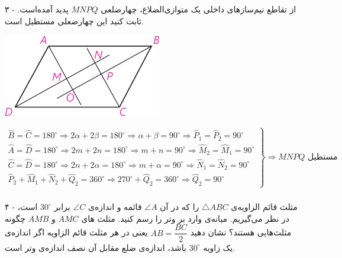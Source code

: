 \documentclass[12pt, a4paper]{book}
\begin{document}
	\subsubsection[3]{}
	    \begin{minipage}{.75\textwidth}
			
			۳ - از تقاطع نیم‌سازهای داخلی یک متوازی‌الضلاع، چهارضلعی
			$MNPQ$
			پدید آمده‌است. ثابت کنید این چهارضعلی مستطیل است.
	   \end{minipage}
	   \begin{minipage}{.25\textwidth}
	   	\begin{flushleft}
	   		\includegraphics{"Shapes/Fasl - 3/Dars 1/PDFs/P63-S5.pdf"}
	   	\end{flushleft}
	   \end{minipage}
   
   	\begin{flushleft}
	$
   		\left.
   			\begin{array}{lll}
   				\widehat{B} = \widehat{C} = 180^{\circ} \Rightarrow 2 \alpha + 2 \beta =180^{\circ} \Rightarrow \alpha + \beta = 90^{\circ}  \Rightarrow \widehat{P}_1 = \widehat{P}_2 = 90^{\circ} \\
			   	\widehat{A} = \widehat{D} = 180^{\circ} \Rightarrow 2m + 2n =180^{\circ} \Rightarrow m + n = 90^{\circ}  \Rightarrow \widehat{M}_2 = \widehat{M}_1 = 90^{\circ} \\
			   	\widehat{C} = \widehat{D} = 180^{\circ} \Rightarrow 2 n + 2 \alpha =180^{\circ} \Rightarrow m + \alpha = 90^{\circ}  \Rightarrow \widehat{N}_1 = \widehat{N}_2 = 90^{\circ}  \\
	   	   		\widehat{P}_2 + \widehat{M}_1 + \widehat{N}_2 + \widehat{Q}_2= 360^{\circ} \Rightarrow 270^{\circ} + \widehat{Q}_2 = 360^{\circ} \Rightarrow \widehat{Q}_2 = 90^{\circ} 
   			\end{array}
   		\right\}
   		\Rightarrow \mbox{$MNPQ$ مستطیل}
   	$
   \end{flushleft}
   
	\subsubsection[4]{}
	 ۴ - مثلث قائم الزاویه‌ی 
	$\triangle ABC$
	  را که در آن 
	$\angle A$
	   قائمه و اندازه‌ی
	$\angle C$
	    برابر 
	$30^{\circ}$
	     است، در نظر می‌گیریم. میانه‌ی وارد بر وتر را رسم کنید. مثلث های 
	$AMC$
	و
	$AMB$
	 چگونه مثلث‌هایی هستند؟ نشان دهید 
	$AB = \dfrac{BC}{2}$
	  یعنی در هر مثلث قائم الزاویه اگر اندازه‌ی یک زاویه 
	$30^{\circ}$
	   باشد، اندازه‌ی ضلع مقابل آن نصف اندازه‌ی وتر است.
	 
\end{document}
